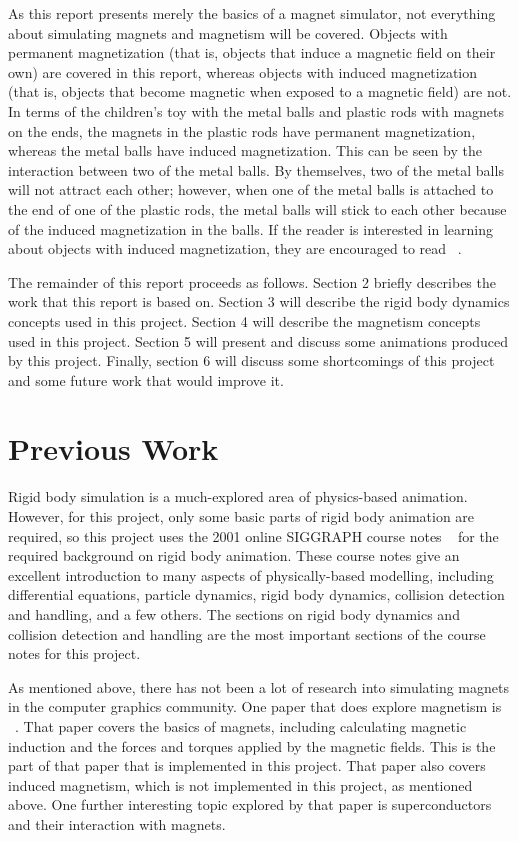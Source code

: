 \documentclass[tog]{acmsiggraph}
\begin{document}
As this report presents merely the basics of a magnet simulator, not everything about simulating magnets and magnetism will be covered. Objects with permanent magnetization (that is, objects that induce a magnetic field on their own) are covered in this report, whereas objects with induced magnetization (that is, objects that become magnetic when exposed to a magnetic field) are not. In terms of the children's toy with the metal balls and plastic rods with magnets on the ends, the magnets in the plastic rods have permanent magnetization, whereas the metal balls have induced magnetization. This can be seen by the interaction between two of the metal balls. By themselves, two of the metal balls will not attract each other; however, when one of the metal balls is attached to the end of one of the plastic rods, the metal balls will stick to each other because of the induced magnetization in the balls. If the reader is interested in learning about objects with induced magnetization, they are encouraged to read ~\cite{Thomaszewski:2008:MIM}.

The remainder of this report proceeds as follows. Section 2 briefly describes the work that this report is based on. Section 3 will describe the rigid body dynamics concepts used in this project. Section 4 will describe the magnetism concepts used in this project. Section 5 will present and discuss some animations produced by this project. Finally, section 6 will discuss some shortcomings of this project and some future work that would improve it.

\section{Previous Work}

Rigid body simulation is a much-explored area of physics-based animation. However, for this project, only some basic parts of rigid body animation are required, so this project uses the 2001 online SIGGRAPH course notes ~\cite{pixarnotes} for the required background on rigid body animation. These course notes give an excellent introduction to many aspects of physically-based modelling, including differential equations, particle dynamics, rigid body dynamics, collision detection and handling, and a few others. The sections on rigid body dynamics and collision detection and handling are the most important sections of the course notes for this project.

As mentioned above, there has not been a lot of research into simulating magnets in the computer graphics community. One paper that does explore magnetism is ~\cite{Thomaszewski:2008:MIM}. That paper covers the basics of magnets, including calculating magnetic induction and the forces and torques applied by the magnetic fields. This is the part of that paper that is implemented in this project. That paper also covers induced magnetism, which is not implemented in this project, as mentioned above. One further interesting topic explored by that paper is superconductors and their interaction with magnets.
\end{document}
